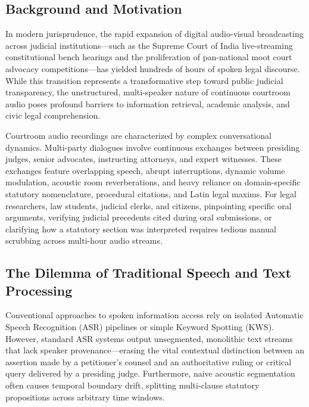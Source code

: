 \documentclass{llncs}
\begin{document}
\subsection{Background and Motivation}
In modern jurisprudence, the rapid expansion of digital audio-visual broadcasting across judicial institutions—such as the Supreme Court of India live-streaming constitutional bench hearings and the proliferation of pan-national moot court advocacy competitions—has yielded hundreds of hours of spoken legal discourse. While this transition represents a transformative step toward public judicial transparency, the unstructured, multi-speaker nature of continuous courtroom audio poses profound barriers to information retrieval, academic analysis, and civic legal comprehension.

Courtroom audio recordings are characterized by complex conversational dynamics. Multi-party dialogues involve continuous exchanges between presiding judges, senior advocates, instructing attorneys, and expert witnesses. These exchanges feature overlapping speech, abrupt interruptions, dynamic volume modulation, acoustic room reverberations, and heavy reliance on domain-specific statutory nomenclature, procedural citations, and Latin legal maxims. For legal researchers, law students, judicial clerks, and citizens, pinpointing specific oral arguments, verifying judicial precedents cited during oral submissions, or clarifying how a statutory section was interpreted requires tedious manual scrubbing across multi-hour audio streams.

\subsection{The Dilemma of Traditional Speech and Text Processing}
Conventional approaches to spoken information access rely on isolated Automatic Speech Recognition (ASR) pipelines or simple Keyword Spotting (KWS). However, standard ASR systems output unsegmented, monolithic text streams that lack speaker provenance—erasing the vital contextual distinction between an assertion made by a petitioner's counsel and an authoritative ruling or critical query delivered by a presiding judge. Furthermore, naive acoustic segmentation often causes temporal boundary drift, splitting multi-clause statutory propositions across arbitrary time windows.
\end{document}
